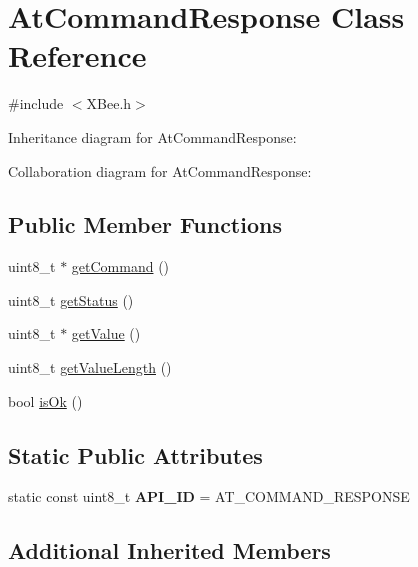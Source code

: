 \hypertarget{class_at_command_response}{}\section{At\+Command\+Response Class Reference}
\label{class_at_command_response}


{\ttfamily \#include $<$X\+Bee.\+h$>$}



Inheritance diagram for At\+Command\+Response\+:


Collaboration diagram for At\+Command\+Response\+:
\subsection*{Public Member Functions}
\begin{DoxyCompactItemize}
\item 
uint8\+\_\+t $\ast$ \hyperlink{class_at_command_response_a20f1bf08ba77f2bc74f009318a6fd133}{get\+Command} ()
\item 
uint8\+\_\+t \hyperlink{class_at_command_response_a340822cacf6eed3ef29955dc9610c09f}{get\+Status} ()
\item 
uint8\+\_\+t $\ast$ \hyperlink{class_at_command_response_ad1e2a0b6f8988536c570b116f103e7f9}{get\+Value} ()
\item 
uint8\+\_\+t \hyperlink{class_at_command_response_ad7d6159fa1777144e94a9ccfeaf83662}{get\+Value\+Length} ()
\item 
bool \hyperlink{class_at_command_response_ab606b3dc93f809b828b54e98a79711d8}{is\+Ok} ()
\end{DoxyCompactItemize}
\subsection*{Static Public Attributes}
\begin{DoxyCompactItemize}
\item 
\hypertarget{class_at_command_response_a2be7d0749cc45a77b53bb254f6fb91c5}{}\label{class_at_command_response_a2be7d0749cc45a77b53bb254f6fb91c5} 
static const uint8\+\_\+t {\bfseries A\+P\+I\+\_\+\+ID} = A\+T\+\_\+\+C\+O\+M\+M\+A\+N\+D\+\_\+\+R\+E\+S\+P\+O\+N\+SE
\end{DoxyCompactItemize}
\subsection*{Additional Inherited Members}


